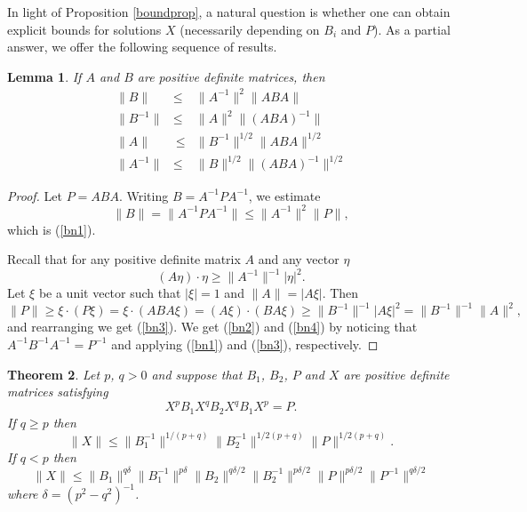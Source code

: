\documentclass{amsart}
\newtheorem{thm}{Theorem}[section]
\newtheorem{lem}[thm]{Lemma}
\theoremstyle{definition}
\theoremstyle{remark}
\numberwithin{equation}{section}
\newcommand{\<}{\langle}
\renewcommand{\>}{\rangle}
\begin{document}
In light of Proposition \ref{boundprop}, a natural question is
whether one can obtain explicit bounds for solutions $X$
(necessarily depending on $B_i$ and $P$).  As a partial answer, we
offer the following sequence of results.

\begin{lem} \label{b1}
If $A$ and $B$ are positive definite matrices, then
\begin{eqnarray}
\| B \|& \leq & \| A^{-1}\|^2 \| A B A \| \label{bn1} \\
\| B^{-1}\| & \leq & \| A \|^2 \| (A B A)^{-1}\| \label{bn2}\\
\| A \| &\ \leq & \| B^{-1} \|^{1/2} \| A B A \|^{1/2} \label{bn3}\\
\| A^{-1} \| & \leq & \| B \|^{1/2} \| (A B A)^{-1} \|^{1/2}
\label{bn4}
\end{eqnarray}
\end{lem}

\begin{proof}
Let $P=ABA$. Writing $B = A^{-1} P A^{-1}$, we estimate
\[ \| B \| = \| A^{-1} P A^{-1} \| \leq \| A^{-1}\|^2 \| P\|, \]
which is (\ref{bn1}).

Recall that for any positive definite matrix $A$ and any vector
$\eta$
\[ (A\eta)\cdot \eta \geq \| A^{-1}\|^{-1} |\eta|^2.\]
Let $\xi$ be a unit vector such that $|\xi |=1$ and $\| A \| =
|A\xi|$. Then
\[ \| P \| \geq \xi \cdot (P\xi) = \xi \cdot (ABA\xi) =
(A\xi)\cdot (BA\xi) \geq \| B^{-1} \|^{-1} |A\xi|^2 = \| B^{-1}
\|^{-1} \| A \|^2, \] and rearranging we get (\ref{bn3}). We get
(\ref{bn2}) and (\ref{bn4}) by noticing that $A^{-1}B^{-1}A^{-1} =
P^{-1}$ and applying (\ref{bn1}) and (\ref{bn3}), respectively.
\end{proof}

\begin{thm}
Let $p$, $q > 0$ and suppose that $B_1$, $B_2$, $P$ and $X$ are
positive definite matrices satisfying
\[ X^p B_1 X^q B_2 X^q B_1 X^p = P. \]
If $q\geq p$ then
\begin{equation} \label{be3}
\| X \| \leq \| B_1^{-1}\|^{1/(p+q)} \| B_2^{-1} \|^{1/2(p+q)} \|
P \|^{1/2(p+q)}.
\end{equation}
If $q<p$ then
\begin{equation} \label{be4}
\| X \| \leq \|B_1 \|^{q\delta} \|B_1^{-1}\|^{p\delta}
\|B_2\|^{q\delta/2} \|B_2^{-1}\|^{p\delta/2} \| P \|^{p\delta/2}
\| P^{-1}\|^{q\delta/2}
\end{equation}
where $\delta = (p^2 - q^2)^{-1}$.
\end{thm}
\end{document}
